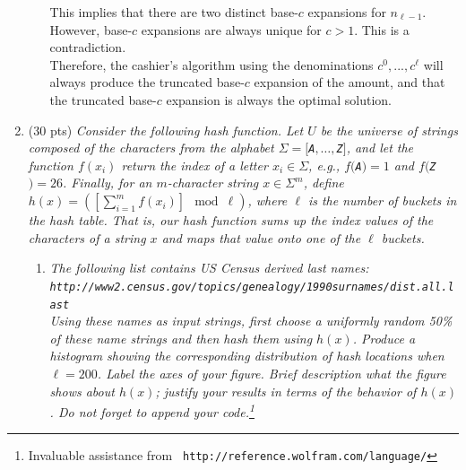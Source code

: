 \documentclass[12pt]{article}
\begin{document}
\begin{enumerate}
\begin{enumerate}
    This implies that there are two distinct base-$c$ expansions for $n_{\ell-1}$. However, base-$c$ expansions are always unique for $c>1$. This is a contradiction.\\
    
    Therefore, the cashier's algorithm using the denominations $c^0,...,c^{\ell}$ will always produce the truncated base-$c$ expansion of the amount, and that the truncated base-$c$ expansion is always the optimal solution.
    
	\end{enumerate}


    \newpage
	\item (30 pts) \textit{Consider the following hash function. Let $U$ be the universe of strings composed of the characters from the alphabet $\Sigma=[${\tt A}$,\dots,${\tt Z}$]$, and let the function $f(x_{i})$ return the 
index of a letter $x_{i}\in \Sigma$, e.g., $f(${\tt A}$)=1$ and $f(${\tt Z}$)=26$. Finally, for an $m$-character string $x\in \Sigma^{m}$, define $h(x) = \left(\left[\sum_{i=1}^{m}f(x_{i})\right]\!\! \mod \ell\right)$, where $\ell$ 
is the number of buckets in the hash table. That is, our hash function sums up the index values of the characters of a string $x$ and maps that value onto one of the $\ell$ buckets.}

	\begin{enumerate}

	\item \textit{The following list contains US Census derived last names: \\
	{\tt http://www2.census.gov/topics/genealogy/1990surnames/dist.all.last} \\
	Using these names as input strings, first choose a uniformly random 50\% of these name strings and then hash them using $h(x)$. Produce a histogram showing the corresponding distribution of hash locations when $\ell=200$. 
Label the axes of your figure. Brief description what the figure shows about $h(x)$; justify your results in terms of the behavior of $h(x)$. Do not forget to append your code.\footnote{Invaluable assistance from {\tt 
http://reference.wolfram.com/language/}}}
	

\end{enumerate}
\end{enumerate}
\end{document}
